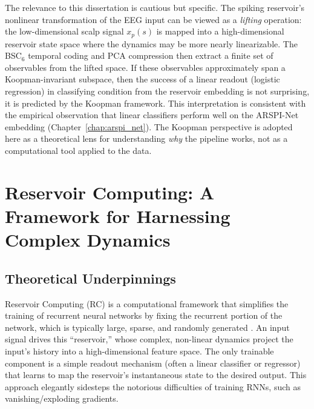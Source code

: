 The relevance to this dissertation is cautious but specific. The spiking reservoir's nonlinear transformation of the EEG input can be viewed as a \emph{lifting} operation: the low-dimensional scalp signal $x_p(s)$ is mapped into a high-dimensional reservoir state space where the dynamics may be more nearly linearizable. The BSC$_6$ temporal coding and PCA compression then extract a finite set of observables from the lifted space. If these observables approximately span a Koopman-invariant subspace, then the success of a linear readout (logistic regression) in classifying condition from the reservoir embedding is not surprising, it is predicted by the Koopman framework. This interpretation is consistent with the empirical observation that linear classifiers perform well on the ARSPI-Net embedding (Chapter~\ref{chap:arspi_net}). The Koopman perspective is adopted here as a theoretical lens for understanding \emph{why} the pipeline works, not as a computational tool applied to the data.


\section{Reservoir Computing: A Framework for Harnessing Complex Dynamics}
\label{sec:reservoir_computing}

\subsection{Theoretical Underpinnings}
\label{sec:rc_theory}
Reservoir Computing (RC) is a computational framework that simplifies the training of recurrent neural networks by fixing the recurrent portion of the network, which is typically large, sparse, and randomly generated \cite{jaeger2001echo}. An input signal drives this ``reservoir,'' whose complex, non-linear dynamics project the input's history into a high-dimensional feature space. The only trainable component is a simple readout mechanism (often a linear classifier or regressor) that learns to map the reservoir's instantaneous state to the desired output. This approach elegantly sidesteps the notorious difficulties of training RNNs, such as vanishing/exploding gradients.

